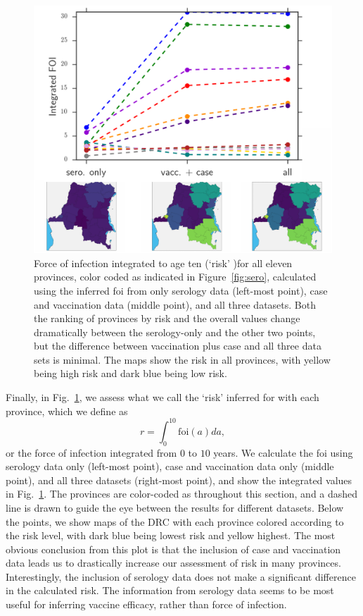 \documentclass[nofootinbib,aps,pre,twocolumn,superscriptaddress,showkeys,showpacs]{revtex4-1}
\begin{document}
\begin{figure}
\includegraphics[width=\columnwidth,angle=0]{figures/RiskRank-crop.pdf}
\caption{\label{fig:riskrank} Force of infection integrated to age ten (`risk' )for all eleven provinces, color coded as indicated in Figure~\ref{fig:sero}, calculated using the inferred foi from only serology data (left-most point), case and vaccination data (middle point), and all three datasets. Both the ranking of provinces by risk and the overall values change dramatically between the serology-only and the other two points, but the difference between vaccination plus case and all three data sets is minimal. The maps show the risk in all provinces, with yellow being high risk and dark blue being low risk. }
\end{figure}

Finally, in Fig.~\ref{fig:riskrank}, we assess what we call the `risk' inferred for with each province, which we define as
\begin{equation}
r = \int_0^{10} \mathrm{foi}(a) da,
\end{equation}
 or the force of infection integrated from 0 to $10$ years. We calculate the foi using serology data only (left-most point), case and vaccination data only (middle point), and all three datasets (right-most point), and show the integrated values in Fig.~\ref{fig:riskrank}. The provinces are color-coded as throughout this section, and a dashed line is drawn to guide the eye between the results for different datasets. Below the points, we show maps of the DRC with each province colored according to the risk level, with dark blue being lowest risk and yellow highest. The most obvious conclusion from this plot is that the inclusion of case and vaccination data leads us to drastically increase our assessment of risk in many provinces. Interestingly, the inclusion of serology data does not make a significant difference in the calculated risk. The information from serology data seems to be most useful for inferring vaccine efficacy, rather than force of infection.
\end{document}
